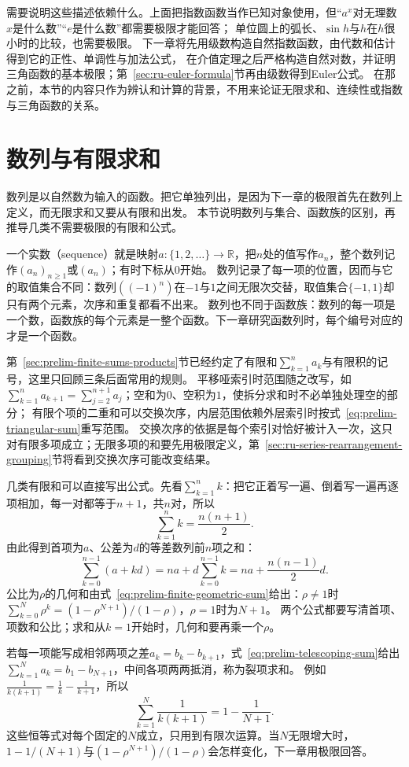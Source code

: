需要说明这些描述依赖什么。上面把指数函数当作已知对象使用，但“$a^x$对无理数$x$是什么数”“$e$是什么数”都需要极限才能回答；
单位圆上的弧长、$\sin h$与$h$在$h$很小时的比较，也需要极限。
下一章将先用级数构造自然指数函数，由代数和估计得到它的正性、单调性与加法公式，
在介值定理之后严格构造自然对数，并证明三角函数的基本极限；第~\ref{sec:ru-euler-formula}节再由级数得到Euler公式。
在那之前，本节的内容只作为辨认和计算的背景，不用来论证无限求和、连续性或指数与三角函数的关系。
\section{数列与有限求和}
\label{sec:ru-sequences-finite-sums}

数列是以自然数为输入的函数。把它单独列出，是因为下一章的极限首先在数列上定义，而无限求和又要从有限和出发。
本节说明数列与集合、函数族的区别，再推导几类不需要极限的有限和公式。

一个实数（sequence）就是映射$a:\{1,2,\ldots\}\to\mathbb R$，把$n$处的值写作$a_n$，整个数列记作$(a_n)_{n\geq1}$或$(a_n)$；有时下标从$0$开始。
数列记录了每一项的位置，因而与它的取值集合不同：数列$((-1)^n)$在$-1$与$1$之间无限次交替，取值集合$\{-1,1\}$却只有两个元素，次序和重复都看不出来。
数列也不同于函数族：数列的每一项是一个数，函数族的每个元素是一整个函数。下一章研究函数列时，每个编号对应的才是一个函数。

第~\ref{sec:prelim-finite-sums-products}节已经约定了有限和$\sum_{k=1}^na_k$与有限积的记号，这里只回顾三条后面常用的规则。
平移哑索引时范围随之改写，如$\sum_{k=1}^{n}a_{k+1}=\sum_{j=2}^{n+1}a_j$；空和为$0$、空积为$1$，使拆分求和时不必单独处理空的部分；
有限个项的二重和可以交换次序，内层范围依赖外层索引时按式~\eqref{eq:prelim-triangular-sum}重写范围。
交换次序的依据是每个索引对恰好被计入一次，这只对有限多项成立；无限多项的和要先用极限定义，第~\ref{sec:ru-series-rearrangement-grouping}节将看到交换次序可能改变结果。

几类有限和可以直接写出公式。先看$\sum_{k=1}^nk$：把它正着写一遍、倒着写一遍再逐项相加，每一对都等于$n+1$，共$n$对，所以
\[
 \sum_{k=1}^nk=\frac{n(n+1)}2.
\]
由此得到首项为$a$、公差为$d$的等差数列前$n$项之和：
\[
 \sum_{k=0}^{n-1}(a+kd)=na+d\sum_{k=0}^{n-1}k=na+\frac{n(n-1)}2d.
\]
公比为$\rho$的几何和由式~\eqref{eq:prelim-finite-geometric-sum}给出：$\rho\neq1$时$\sum_{k=0}^N\rho^k=(1-\rho^{N+1})/(1-\rho)$，$\rho=1$时为$N+1$。
两个公式都要写清首项、项数和公比；求和从$k=1$开始时，几何和要再乘一个$\rho$。

若每一项能写成相邻两项之差$a_k=b_k-b_{k+1}$，式~\eqref{eq:prelim-telescoping-sum}给出$\sum_{k=1}^Na_k=b_1-b_{N+1}$，中间各项两两抵消，称为裂项求和。
例如$\frac1{k(k+1)}=\frac1k-\frac1{k+1}$，所以
\[
 \sum_{k=1}^N\frac1{k(k+1)}=1-\frac1{N+1}.
\]
这些恒等式对每个固定的$N$成立，只用到有限次运算。当$N$无限增大时，$1-1/(N+1)$与$(1-\rho^{N+1})/(1-\rho)$会怎样变化，下一章用极限回答。

